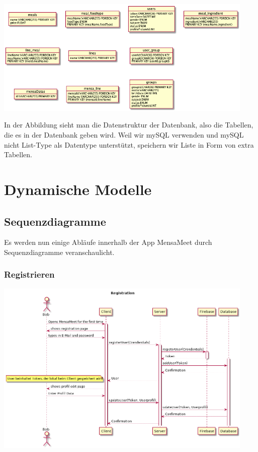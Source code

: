 \documentclass[a4paper]{scrreprt}
\begin{document}
\begin{center}
	\includegraphics[width=0.93\textwidth]{Objektdiagramme/datenstrukturen.png}
\end{center}
In der Abbildung sieht man die Datenstruktur der Datenbank, also die Tabellen, die es in der Datenbank geben wird. Weil wir mySQL verwenden und mySQL nicht List-Type als Datentype unterstützt, speichern wir Liste in Form von extra Tabellen.

\chapter{Dynamische Modelle}

\section{Sequenzdiagramme}
Es werden nun einige Abläufe innerhalb der App  MensaMeet durch Sequenzdiagramme veranschaulicht. 
\subsection{Registrieren}
\begin{center}
	\includegraphics[width=0.93\textwidth]{Sequenzdiagramme/Registration.png}
\end{center}
\end{document}
